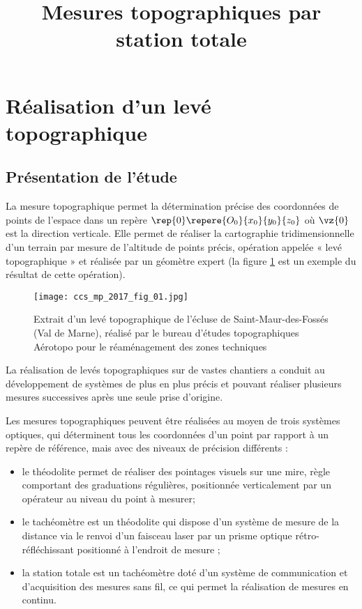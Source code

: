 \title{Mesures topographiques par station totale}

\section{Réalisation d’un levé topographique \label{CCS_MP_2017:p1}}
\subsection{Présentation de l'étude}
\ifprof
\else
La mesure topographique permet la détermination précise des coordonnées de points de l’espace dans un repère $\rep{0}\repere{O_0}{x_0}{y_0}{z_0}$ où $\vz{0}$ est la direction verticale. Elle permet de réaliser la cartographie tridimensionnelle d’un
terrain par mesure de l’altitude de points précis, opération appelée « levé topographique » et réalisée par un
géomètre expert (la figure \ref{CCS_MP_2017:fig_01} est un exemple du résultat de cette opération).

\begin{figure}[!h]
\centering
\texttt{[image: ccs\_mp\_2017\_fig\_01.jpg]}
\caption{Extrait d’un levé topographique de l’écluse de Saint-Maur-des-Fossés (Val de Marne), réalisé par le bureau d’études topographiques Aérotopo pour le réaménagement des zones techniques \label{CCS_MP_2017:fig_01}}
\end{figure}

La réalisation de levés topographiques sur de vastes chantiers a conduit au développement de systèmes de plus
en plus précis et pouvant réaliser plusieurs mesures successives après une seule prise d’origine.

Les mesures topographiques peuvent être réalisées au moyen de trois systèmes optiques, qui déterminent tous les coordonnées d'un point par rapport à un repère de référence, mais avec des niveaux de précision différents :

\begin{itemize}
  \item le théodolite permet de réaliser des pointages visuels sur une mire, règle comportant des graduations régulières, positionnée verticalement par un opérateur au niveau du point à mesurer;
  \item le tachéomètre est un théodolite qui dispose d'un système de mesure de la distance via le renvoi d'un faisceau laser par un prisme optique rétro-réfléchissant positionné à l'endroit de mesure ;
  \item la station totale est un tachéomètre doté d'un système de communication et d'acquisition des mesures sans fil, ce qui permet la réalisation de mesures en continu.
\end{itemize}

